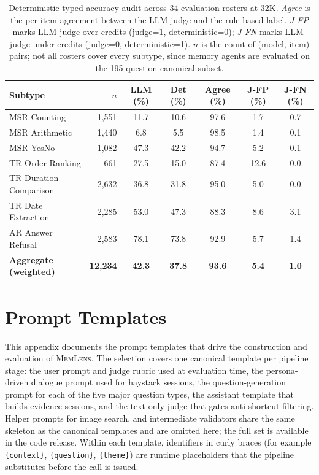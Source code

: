 \documentclass{llmxive}
\providecommand{\bench}{\textsc{MemLens}}
\begin{document}
\begin{table}[!htbp]
\centering
\small
\begin{tabular}{@{}lrccccc@{}}
\toprule
\textbf{Subtype} & \textbf{$n$} & \textbf{LLM (\%)} & \textbf{Det (\%)} & \textbf{Agree (\%)} & \textbf{J-FP (\%)} & \textbf{J-FN (\%)} \\
\midrule
MSR Counting & 1{,}551 & 11.7 & 10.6 & 97.6 & 1.7 & 0.7 \\
MSR Arithmetic & 1{,}440 & 6.8 & 5.5 & 98.5 & 1.4 & 0.1 \\
MSR YesNo & 1{,}082 & 47.3 & 42.2 & 94.7 & 5.2 & 0.1 \\
TR Order Ranking & 661 & 27.5 & 15.0 & 87.4 & 12.6 & 0.0 \\
TR Duration Comparison & 2{,}632 & 36.8 & 31.8 & 95.0 & 5.0 & 0.0 \\
TR Date Extraction & 2{,}285 & 53.0 & 47.3 & 88.3 & 8.6 & 3.1 \\
AR Answer Refusal & 2{,}583 & 78.1 & 73.8 & 92.9 & 5.7 & 1.4 \\
\midrule
\textbf{Aggregate (weighted)} & \textbf{12{,}234} & \textbf{42.3} & \textbf{37.8} & \textbf{93.6} & \textbf{5.4} & \textbf{1.0} \\
\bottomrule
\end{tabular}
\caption{Deterministic typed-accuracy audit across 34 evaluation rosters at 32K. \textit{Agree} is the per-item agreement between the LLM judge and the rule-based label. \textit{J-FP} marks LLM-judge over-credits (judge=1, deterministic=0); \textit{J-FN} marks LLM-judge under-credits (judge=0, deterministic=1). $n$ is the count of (model, item) pairs; not all rosters cover every subtype, since memory agents are evaluated on the 195-question canonical subset.}
\label{tab:det_audit}
\end{table}



\section{Prompt Templates}
\label{app:prompts}

This appendix documents the prompt templates that drive the construction and evaluation of \bench. The selection covers one canonical template per pipeline stage: the user prompt and judge rubric used at evaluation time, the persona-driven dialogue prompt used for haystack sessions, the question-generation prompt for each of the five major question types, the assistant template that builds evidence sessions, and the text-only judge that gates anti-shortcut filtering. Helper prompts for image search, and intermediate validators share the same skeleton as the canonical templates and are omitted here; the full set is available in the code release. Within each template, identifiers in curly braces (for example \texttt{\{context\}}, \texttt{\{question\}}, \texttt{\{theme\}}) are runtime placeholders that the pipeline substitutes before the call is issued.
\end{document}
